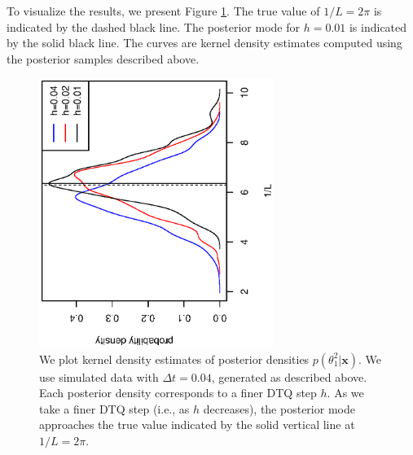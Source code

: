 \documentclass[graybox]{svmult}
\begin{document}
To visualize the results, we present Figure \ref{fig:lcosc}.  The true
value of $1/L = 2 \pi$ is indicated by the dashed black line.  The
posterior mode for $h = 0.01$ is indicated by the solid black line.
The curves are kernel density estimates computed using the posterior
samples described above.
\begin{figure}
\begin{center}
\vspace{-0.55in}
\includegraphics[width=3in,angle=270]{densities.eps}
\end{center}
\vspace{-0.35in}
\caption{We plot kernel density estimates of posterior densities
  $p(\theta_1^2 | \mathbf{x})$.  We use simulated data with  $\Delta t
  = 0.04$, generated as described above.  Each posterior density
  corresponds to a finer DTQ step $h$.  As we take a finer DTQ step
  (i.e., as $h$ decreases), the posterior mode approaches the true
  value indicated by the solid vertical line at $1/L = 2 \pi$.}
\label{fig:lcosc}
\end{figure}
\end{document}
